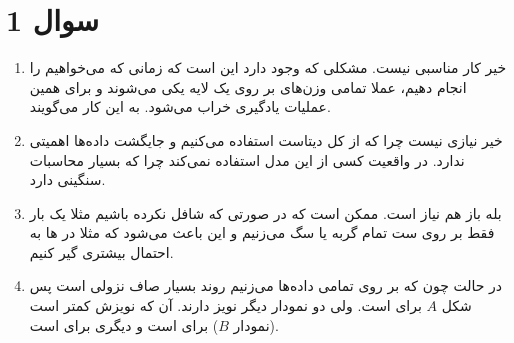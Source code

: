 \section*{سوال 1}
\begin{enumerate}
    \item خیر کار مناسبی نیست. مشکلی که وجود دارد این است که زمانی که می‌خواهیم 
    را انجام دهیم، عملا تمامی وزن‌های بر روی یک لایه یکی می‌شوند و برای همین عملیات یادگیری خراب می‌شود.
    به این کار
    می‌گویند.
     
    \item خیر نیازی نیست چرا که از کل دیتاست استفاده می‌کنیم و جایگشت داده‌ها اهمیتی ندارد. در واقعیت کسی
    از این مدل استفاده نمی‌کند چرا که بسیار محاسبات سنگینی دارد.
    \item بله باز هم نیاز است. ممکن است که در صورتی که شافل نکرده باشیم مثلا یک بار فقط بر روی ست تمام گربه یا سگ
    می‌زنیم و این باعث می‌شود که مثلا در
    ها
    به احتمال بیشتری گیر کنیم.
    \item در حالت  چون که بر روی تمامی داده‌ها
    می‌زنیم روند
    بسیار صاف نزولی است پس شکل
    $A$
    برای
    است. ولی دو نمودار دیگر نویز دارند. آن که نویزش کمتر است
    (نمودار $B$)
    برای
    است و دیگری برای
    است.
\end{enumerate}